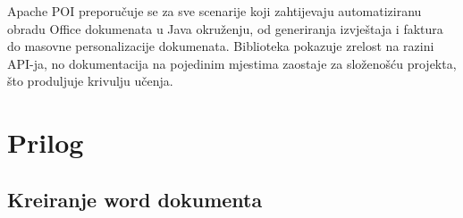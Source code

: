 \documentclass[]{foi}
\begin{document}
Apache POI preporučuje se za sve scenarije koji zahtijevaju automatiziranu obradu Office dokumenata u Java okruženju, od generiranja izvještaja i faktura do masovne personalizacije dokumenata. Biblioteka pokazuje zrelost na razini API-ja, no dokumentacija na pojedinim mjestima zaostaje za složenošću projekta, što produljuje krivulju učenja.

\clearpage
{}
{}

\makeatletter
\renewcommand{\lstlistoflistings}{%
  \chapter*{\lstlistlistingname}%
}
\makeatother

\lstlistoflistings

\makebackmatter

\appendices

\chapter*{Prilog}

\section*{Kreiranje word dokumenta}
\label{word-dokument}
\end{document}
